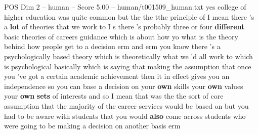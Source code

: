 \begin{textsample}{POS Dim 2 – human – Score 5.00 – human/t001509\_human.txt}  \label{ex:f2_pos_037}
yes college of higher education was quite common but the the tthe principle of I mean there 's a \textbf{lot} of theories that we work to I s there 's probably three or four \textbf{different} basic theories of careers guidance which is about how yo what is the theory behind how people get to a decision erm and erm you know there 's a psychologically based theory which is theoretically what we 'd all work to which is psychological basically which is saying that making the assumption that once you 've got a certain academic achievement then it in effect gives you an independence so you can base a decision on your \textbf{own} skills your \textbf{own} values your \textbf{own} \textbf{sets} of interests and so I mean that was the the sort of core assumption that the majority of the career services would be based on but you had to be aware with students that you would \textbf{also} come across students who were going to be making a decision on another basis erm

\end{textsample}
